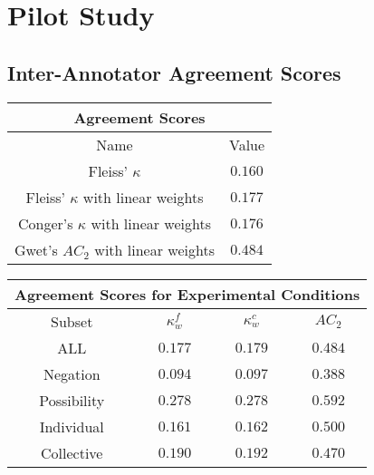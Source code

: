 \section{Pilot Study}
\subsection{Inter-Annotator Agreement Scores}

\begin{minipage}{\linewidth}\begin{tabular}{|c|c|}
\hline
\multicolumn{2}{|c|}{Agreement Scores}\\\hline
Name & Value \\\hline
Fleiss' $\kappa$ & $0.160$\\\hline
Fleiss' $\kappa$ with linear weights & $0.177$\\\hline
Conger's $\kappa$ with linear weights & $0.176$\\\hline
Gwet's $AC_2$ with linear weights & $0.484$\\\hline
\end{tabular}
\end{minipage}
\newline
\newline
\newline
\begin{minipage}{\linewidth}
\begin{tabular}{|c|c|c|c|}
\hline
\multicolumn{4}{|c|}{Agreement Scores for Experimental Conditions}\\\hline
Subset &  $\kappa^{f}_{w}$ & $\kappa^{c}_{w}$ & $AC_2$\\\hline
ALL & $0.177$ & $0.179$ & $0.484$\\\hline
Negation & $0.094$ & $0.097$ & $0.388$\\\hline
Possibility & $0.278$ & $0.278$ & $0.592$\\\hline
Individual & $0.161$ & $0.162$ & $0.500$\\\hline
Collective & $0.190$ & $0.192$ & $0.470$\\\hline
\end{tabular}
\end{minipage}
\newline
\newline
\newline
